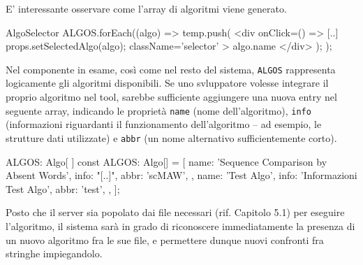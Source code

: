E' interessante osservare come l'array di algoritmi viene generato. 

\begin{sexylisting}{AlgoSelector}
ALGOS.forEach((algo) => {
  temp.push(
    <div
      onClick={() => {
		[..] props.setSelectedAlgo(algo);
	  }}
	  className='selector'
	>
	  {algo.name}
    </div>
  );
});
\end{sexylisting}

Nel componente in esame, così come nel resto del sistema, \verb|ALGOS| rappresenta logicamente gli algoritmi disponibili. Se uno svluppatore volesse integrare il proprio algoritmo nel tool, sarebbe sufficiente aggiungere una nuova entry nel seguente array, indicando le proprietà \verb|name| (nome dell'algoritmo), \verb|info| (informazioni riguardanti il funzionamento dell'algoritmo -- ad esempio, le strutture dati utilizzate) e \verb|abbr| (un nome alternativo sufficientemente corto).

\begin{sexylisting}{ALGOS: Algo[ ]}
const ALGOS: Algo[] = [
  {
    name: 'Sequence Comparison by Absent Words',
	info: "[..]",
	abbr: 'scMAW',
  },
  {
    name: 'Test Algo',
	info: 'Informazioni Test Algo',
	abbr: 'test',
  },
];
\end{sexylisting}

Posto che il server sia popolato dai file necessari (rif. Capitolo 5.1) per eseguire l'algoritmo, il sistema sarà in grado di riconoscere immediatamente la presenza di un nuovo algoritmo fra le sue file, e permettere dunque nuovi confronti fra stringhe impiegandolo.
